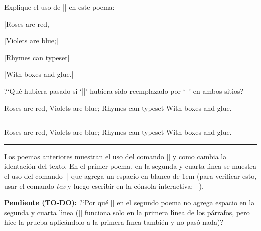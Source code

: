 


\bigskip

\enunciadoS Explique el uso de |\quad| en este poema:

|Roses are red,|

|\quad Violets are blue;|

|Rhymes can typeset|

|\quad With boxes and glue.|

\noindent?`Qu\'e hubiera pasado si `|\quad|' hubiera sido reemplazado
por `|\indent|' en ambos sitios?

\bigskip

\respuesta{}

{\obeylines\smallskip
Roses are red,
\quad Violets are blue;
Rhymes can typeset
\quad With boxes and glue.
\smallskip}
\medskip

\hrule

{\obeylines\smallskip
Roses are red,
\indent Violets are blue;
Rhymes can typeset
\indent With boxes and glue.
\smallskip}
\medskip

\hrule

\medskip

Los poemas anteriores muestran el uso del comando |\obeylines| y como
cambia la identaci\'on del texto. En el primer poema, en la segunda y
cuarta l\'{\i}nea se muestra el uso del comando |\quad| que agrega un
espacio en blanco de 1em (para verificar esto, usar el comando {\sl
tex} y luego escribir en la c\'onsola interactiva: |\show\quad|).

{\bf Pendiente (TO-DO):} ?`Por qu\'e |\indent| en el segundo poema no
agrega espacio en la segunda y cuarta l\'{\i}nea (|\indent| funciona
solo en la primera l\'{\i}nea de los p\'arrafos, pero hice la prueba
aplic\'andolo a la primera l\'{\i}nea tambi\'en y no pas\'o nada)?

\bye

